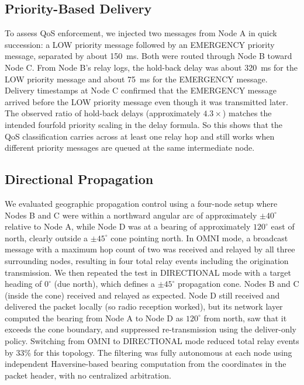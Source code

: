 \subsection{Priority-Based Delivery}

To assess QoS enforcement, we injected two messages from Node A in quick succession: a LOW priority message
followed by an EMERGENCY priority message, separated by about 150~ms. Both were routed through Node B toward
Node C. From Node B's relay logs, the hold-back delay was about 320~ms for the LOW priority message and about
75~ms for the EMERGENCY message. Delivery timestamps at Node C confirmed that the EMERGENCY message arrived
before the LOW priority message even though it was transmitted later. The observed ratio of hold-back delays
(approximately $4.3\times$) matches the intended fourfold priority scaling in the delay formula. So this shows
that the QoS classification carries across at least one relay hop and still works when different priority
messages are queued at the same intermediate node.

\subsection{Directional Propagation}

We evaluated geographic propagation control using a four-node setup where Nodes B and C were within a
northward angular arc of approximately $\pm 40^\circ$ relative to Node A, while Node D was at a bearing of
approximately $120^\circ$ east of north, clearly outside a $\pm 45^\circ$ cone pointing north. In OMNI mode, a
broadcast message with a maximum hop count of two was received and relayed by all three surrounding nodes,
resulting in four total relay events including the origination transmission. We then repeated the test in
DIRECTIONAL mode with a target heading of $0^\circ$ (due north), which defines a $\pm 45^\circ$ propagation cone.
Nodes B and C (inside the cone) received and relayed as expected. Node D still received and delivered the
packet locally (so radio reception worked), but its network layer computed the bearing from Node A to Node D as
$120^\circ$ from north, saw that it exceeds the cone boundary, and suppressed re-transmission using the
deliver-only policy. Switching from OMNI to DIRECTIONAL mode reduced total relay events by 33\% for this
topology. The filtering was fully autonomous at each node using independent Haversine-based bearing
computation from the coordinates in the packet header, with no centralized arbitration.

